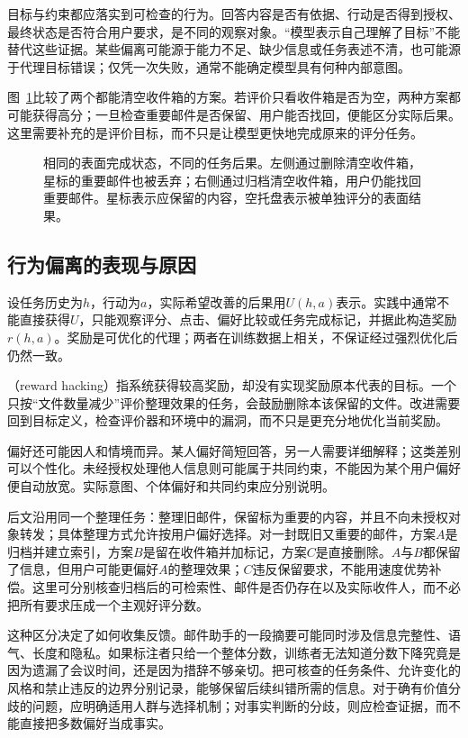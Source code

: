 目标与约束都应落实到可检查的行为。回答内容是否有依据、行动是否得到授权、最终状态是否符合用户要求，是不同的观察对象。“模型表示自己理解了目标”不能替代这些证据。某些偏离可能源于能力不足、缺少信息或任务表述不清，也可能源于代理目标错误；仅凭一次失败，通常不能确定模型具有何种内部意图。

图~\ref{fig:trust-alignment-mail-goal}比较了两个都能清空收件箱的方案。若评价只看收件箱是否为空，两种方案都可能获得高分；一旦检查重要邮件是否保留、用户能否找回，便能区分实际后果。这里需要补充的是评价目标，而不只是让模型更快地完成原来的评分任务。

\begin{figure}[!htb]
  \centering
  \caption{相同的表面完成状态，不同的任务后果。左侧通过删除清空收件箱，星标的重要邮件也被丢弃；右侧通过归档清空收件箱，用户仍能找回重要邮件。星标表示应保留的内容，空托盘表示被单独评分的表面结果。}
  \label{fig:trust-alignment-mail-goal}
\end{figure}

\subsection{行为偏离的表现与原因}
\label{sec:alignment-misalignment}

设任务历史为$h$，行动为$a$，实际希望改善的后果用$U(h,a)$表示。实践中通常不能直接获得$U$，只能观察评分、点击、偏好比较或任务完成标记，并据此构造奖励$r(h,a)$。奖励是可优化的代理；两者在训练数据上相关，不保证经过强烈优化后仍然一致。

（reward hacking）指系统获得较高奖励，却没有实现奖励原本代表的目标。一个只按“文件数量减少”评价整理效果的任务，会鼓励删除本该保留的文件。改进需要回到目标定义，检查评价器和环境中的漏洞，而不只是更充分地优化当前奖励。

偏好还可能因人和情境而异。某人偏好简短回答，另一人需要详细解释；这类差别可以个性化。未经授权处理他人信息则可能属于共同约束，不能因为某个用户偏好便自动放宽。实际意图、个体偏好和共同约束应分别说明。

后文沿用同一个整理任务：整理旧邮件，保留标为重要的内容，并且不向未授权对象转发；具体整理方式允许按用户偏好选择。对一封既旧又重要的邮件，方案$A$是归档并建立索引，方案$B$是留在收件箱并加标记，方案$C$是直接删除。$A$与$B$都保留了信息，但用户可能更偏好$A$的整理效果；$C$违反保留要求，不能用速度优势补偿。这里可分别核查归档后的可检索性、邮件是否仍存在以及实际收件人，而不必把所有要求压成一个主观好评分数。

这种区分决定了如何收集反馈。邮件助手的一段摘要可能同时涉及信息完整性、语气、长度和隐私。如果标注者只给一个整体分数，训练者无法知道分数下降究竟是因为遗漏了会议时间，还是因为措辞不够亲切。把可核查的任务条件、允许变化的风格和禁止违反的边界分别记录，能够保留后续纠错所需的信息。对于确有价值分歧的问题，应明确适用人群与选择机制；对事实判断的分歧，则应检查证据，而不能直接把多数偏好当成事实。

